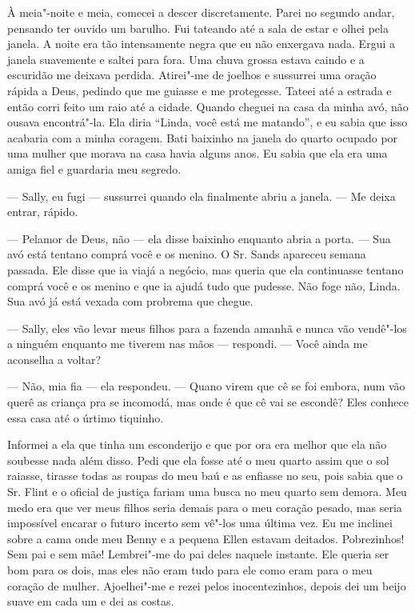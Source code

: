 À meia"-noite e meia, comecei a descer
discretamente. Parei no segundo andar, pensando ter ouvido um barulho.
Fui tateando até a sala de estar e olhei pela janela. A noite era tão
intensamente negra que eu não enxergava nada. Ergui a janela suavemente
e saltei para fora. Uma chuva grossa estava caindo e a escuridão me
deixava perdida. Atirei"-me de joelhos e sussurrei uma oração rápida a
Deus, pedindo que me guiasse e me protegesse. Tateei até a estrada e
então corri feito um raio até a cidade. Quando cheguei na casa da minha
avó, não ousava encontrá"-la. Ela diria ``Linda, você está me matando'',
e eu sabia que isso acabaria com a minha coragem. Bati baixinho na
janela do quarto ocupado por uma mulher que morava na casa havia alguns
anos. Eu sabia que ela era uma amiga fiel e guardaria meu segredo.

--- Sally, eu fugi --- sussurrei quando ela finalmente abriu a janela.
--- Me deixa entrar, rápido.

--- Pelamor de Deus, não --- ela disse baixinho enquanto abria a porta.
--- Sua avó está tentano comprá você e os menino. O Sr. Sands apareceu
semana passada. Ele disse que ia viajá a negócio, mas queria que ela
continuasse tentano comprá você e os menino e que ia ajudá tudo que
pudesse. Não foge não, Linda. Sua avó já está vexada com probrema que
chegue.

--- Sally, eles vão levar meus filhos
para a fazenda amanhã e nunca vão vendê"-los a ninguém enquanto me
tiverem nas mãos --- respondi. --- Você ainda me aconselha a voltar?

--- Não, mia fia --- ela respondeu. ---
Quano virem que cê se foi embora, num vão querê as criança pra se
incomodá, mas onde é que cê vai se escondê? Eles conhece essa casa até o
úrtimo tiquinho.

Informei a ela que tinha um esconderijo
e que por ora era melhor que ela não soubesse nada além disso. Pedi que
ela fosse até o meu quarto assim que o sol raiasse, tirasse todas as
roupas do meu baú e as enfiasse no seu, pois sabia que o Sr. Flint e o
oficial de justiça fariam uma busca no meu quarto sem demora. Meu medo
era que ver meus filhos seria demais para o meu coração pesado, mas
seria impossível encarar o futuro incerto sem vê"-los uma última vez. Eu
me inclinei sobre a cama onde meu Benny e a pequena Ellen estavam
deitados. Pobrezinhos! Sem pai e sem mãe! Lembrei"-me do pai deles
naquele instante. Ele queria ser bom para os dois, mas eles não eram
tudo para ele como eram para o meu coração de mulher. Ajoelhei"-me e
rezei pelos inocentezinhos, depois dei um beijo suave em cada um e dei
as costas.

